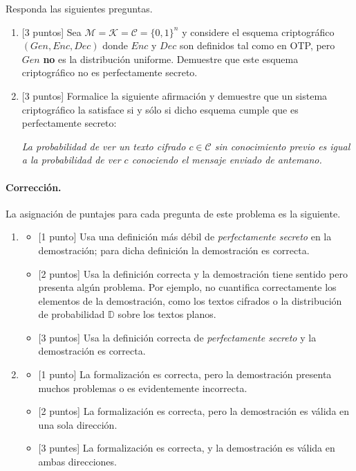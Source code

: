 
Responda las siguientes preguntas.
\begin{enumerate}
\item {[3 puntos]} Sea $\mathcal{M}=\mathcal{K}=\mathcal{C}=\{0, 1\}^n$ y considere el esquema criptográfico $(\textit{Gen}, \textit{Enc}, \textit{Dec})$ donde $\textit{Enc}$ y $\textit{Dec}$ son definidos tal como en OTP, pero $\textit{Gen}$ \textbf{no} es la distribución uniforme. Demuestre que este esquema criptográfico no es perfectamente secreto.

\item {[3 puntos]} Formalice la siguiente afirmación y demuestre que un sistema criptográfico la satisface si y sólo si dicho esquema cumple que es perfectamente secreto:
\begin{center}
  \it{La probabilidad de ver un texto cifrado $c\in \mathcal{C}$ sin conocimiento previo es igual a la probabilidad de ver $c$ conociendo el mensaje enviado de antemano.}
  \end{center}
\end{enumerate}

\medskip

\paragraph{Corrección.} La asignación de puntajes para cada pregunta de este problema es la siguiente.
\begin{enumerate}
  \item
    \begin{itemize}
      \item {[1 punto]} Usa una definición más débil de \emph{perfectamente secreto} en la demostración; para dicha definición la demostración es correcta.
      \item {[2 puntos]} Usa la definición correcta y la demostración tiene sentido pero presenta algún problema. Por ejemplo, no cuantifica correctamente los elementos de la demostración, como los textos cifrados o la distribución de probabilidad $\mathbb{D}$ sobre los textos planos.
      \item {[3 puntos]} Usa la definición correcta de \emph{perfectamente secreto} y la demostración es correcta.
    \end{itemize}
  \item
    \begin{itemize}
      \item {[1 punto]} La formalización es correcta, pero la demostración presenta muchos problemas o es evidentemente incorrecta.
      \item {[2 puntos]} La formalización es correcta, pero la demostración es válida en una sola dirección.
      \item {[3 puntes]} La formalización es correcta, y la demostración es válida en ambas direcciones.
    \end{itemize}
\end{enumerate}

\medskip
